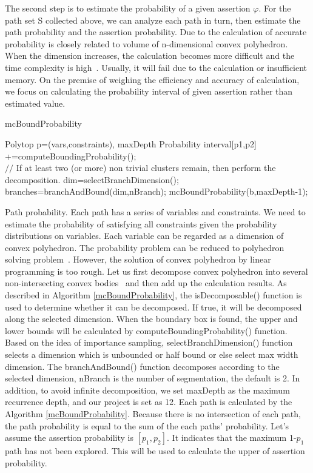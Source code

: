The second step is to estimate the probability of a given assertion $\varphi$. For the path set S collected above, we can analyze each path in turn, then estimate the path probability and the assertion probability. Due to the calculation of accurate probability is closely related to volume of n-dimensional convex polyhedron. When the dimension increases, the calculation becomes more difficult and the time complexity is high~\cite{Arora1998Proof}. Usually, it will fail due to the calculation or insufficient memory. On the premise of weighing the efficiency and accuracy of calculation, we focus on calculating the probability interval of given assertion rather than estimated value.

\begin{algorithm}
	\caption{mcBoundProbability}
	\label{mcBoundProbability}
	\begin{algorithmic}[1]
		\REQUIRE Polytop p=(vars,constraints), maxDepth
		\ENSURE Probability interval[p1,p2]
			\STATE [p1,p2]+=computeBoundingProbability();
		\ENDIF  \\
		$//$ If at least two (or more) non trivial clusters remain, then perform the
		decomposition.  
			\STATE dim=selectBranchDimension();
			\STATE branches=branchAndBound(dim,nBranch);
			\STATE mcBoundProbability(b,maxDepth-1);
			\ENDFOR
		\ENDIF
	\end{algorithmic}
\end{algorithm}

Path probability. Each path has a series of variables and constraints. We need to estimate the probability of satisfying all constraints given the probability distributions on variables. Each variable can be regarded as a dimension of convex polyhedron. The probability problem can be reduced to polyhedron solving problem~\cite{Visser2012Green}. However, the solution of convex polyhedron by linear programming is too rough. Let us first decompose convex polyhedron into several non-intersecting convex bodies~\cite{Bingsheng2020} and then add up the calculation results. As described in Algorithm \ref{mcBoundProbability}, the isDecomposable() function is used to determine whether it can be decomposed. If true, it will be decomposed along the selected dimension. When the boundary box is found, the upper and lower bounds will be calculated by computeBoundingProbability() function. Based on the idea of importance sampling, selectBranchDimension() function selects a dimension which is unbounded or half bound or else select max width dimension. The branchAndBound() function decomposes according to the selected dimension, nBranch is the number of segmentation, the default is 2. In addition, to avoid infinite decomposition, we set maxDepth as the maximum recurrence depth, and our project is set as 12. Each path is calculated by the Algorithm \ref{mcBoundProbability}. Because there is no intersection of each path, the path probability is equal to the sum of the each paths' probability. Let's assume the assertion probability is $[p_1,p_2]$. It indicates that the maximum 1-$p_1$ path has not been explored. This will be used to calculate the upper of assertion probability.


